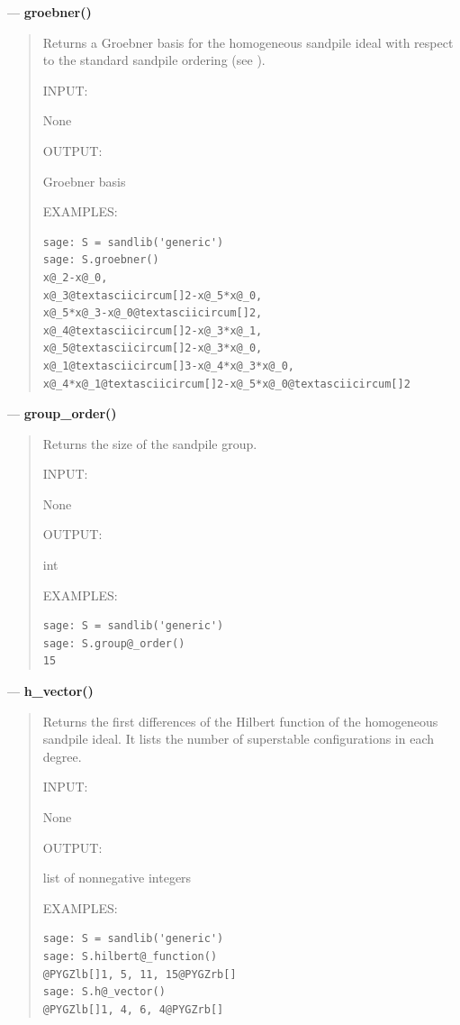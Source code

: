 \documentclass[letterpaper,10pt,english]{manual}
\begin{document}
---
\hypertarget{groebner}{}
\textbf{groebner()}
\begin{quote}

Returns a Groebner basis for the homogeneous sandpile ideal with
respect to the standard sandpile ordering (see ).

INPUT:

None

OUTPUT:

Groebner basis

EXAMPLES:

\begin{Verbatim}[commandchars=@\[\]]
sage: S = sandlib('generic')
sage: S.groebner()
x@_2-x@_0,
x@_3@textasciicircum[]2-x@_5*x@_0,
x@_5*x@_3-x@_0@textasciicircum[]2,
x@_4@textasciicircum[]2-x@_3*x@_1,
x@_5@textasciicircum[]2-x@_3*x@_0,
x@_1@textasciicircum[]3-x@_4*x@_3*x@_0,
x@_4*x@_1@textasciicircum[]2-x@_5*x@_0@textasciicircum[]2
\end{Verbatim}
\end{quote}

---
\hypertarget{group-order}{}
\textbf{group\_order()}
\begin{quote}

Returns the size of the sandpile group.

INPUT:

None

OUTPUT:

int

EXAMPLES:

\begin{Verbatim}[commandchars=@\[\]]
sage: S = sandlib('generic')
sage: S.group@_order()
15
\end{Verbatim}
\end{quote}

---
\hypertarget{h-vector}{}
\textbf{h\_vector()}
\begin{quote}

Returns the first differences of the Hilbert function of the homogeneous
sandpile ideal.  It lists the number of superstable configurations in
each degree.

INPUT:

None

OUTPUT:

list of nonnegative integers

EXAMPLES:

\begin{Verbatim}[commandchars=@\[\]]
sage: S = sandlib('generic')
sage: S.hilbert@_function()
@PYGZlb[]1, 5, 11, 15@PYGZrb[]
sage: S.h@_vector()
@PYGZlb[]1, 4, 6, 4@PYGZrb[]
\end{Verbatim}
\end{quote}
\end{document}
